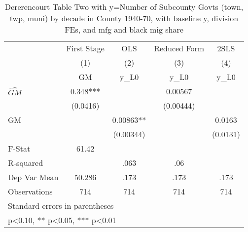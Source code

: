 \begin{table}[htbp]\centering
\def\sym#1{\ifmmode^{#1}\else\(^{#1}\)\fi}
\caption{Dererencourt Table Two with y=Number of Subcounty Govts (town, twp, muni) by decade in County 1940-70, with baseline y, division FEs, and mfg and black mig share}
\begin{tabular}{l*{4}{c}}
\toprule
                    & First Stage   &         OLS   &Reduced Form   &        2SLS   \\
                    &\multicolumn{1}{c}{(1)}&\multicolumn{1}{c}{(2)}&\multicolumn{1}{c}{(3)}&\multicolumn{1}{c}{(4)}\\
                    &\multicolumn{1}{c}{GM}&\multicolumn{1}{c}{y\_L0}&\multicolumn{1}{c}{y\_L0}&\multicolumn{1}{c}{y\_L0}\\
\midrule
$\hat{GM}$          &       0.348***&               &     0.00567   &               \\
                    &    (0.0416)   &               &   (0.00444)   &               \\
\addlinespace
GM                  &               &     0.00863** &               &      0.0163   \\
                    &               &   (0.00344)   &               &    (0.0131)   \\
\midrule
F-Stat              &       61.42   &               &               &               \\
R-squared           &               &        .063   &         .06   &               \\
Dep Var Mean        &      50.286   &        .173   &        .173   &        .173   \\
Observations        &         714   &         714   &         714   &         714   \\
\bottomrule
\multicolumn{5}{l}{\footnotesize Standard errors in parentheses}\\
\multicolumn{5}{l}{\footnotesize * p<0.10, ** p<0.05, *** p<0.01}\\
\end{tabular}
\end{table}
